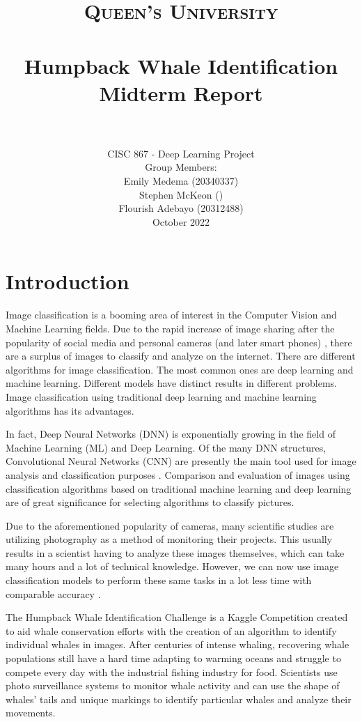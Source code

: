 \documentclass[paper=a4, fontsize=11pt]{scrartcl}
\title{
		\usefont{OT1}{bch}{b}{n}
		\normalfont \normalsize \textsc{Queen's University} \\ [25pt]
		\horrule{0.5pt} \\[0.4cm]
		\huge Humpback Whale Identification Midterm Report \\
		\horrule{2pt} \\[0.5cm]
}
\author{
    \normalfont 
      CISC 867 - Deep Learning Project \\
    \normalfont
    Group Members: \\ 
    \normalsize
    Emily Medema (20340337) \\ 
    \normalsize
    Stephen McKeon () \\ 
    \normalsize
    Flourish Adebayo (20312488) \\
    October 2022 \\ [3pt]}
\date{\vspace{-5ex}}
\numberwithin{equation}{section}		%
\numberwithin{table}{section}				%
\begin{document}
\maketitle



\newpage 

\section*{Introduction}\label{sec: intro}
Image classification is a booming area of interest in the Computer Vision and Machine Learning fields. Due to the rapid increase of image sharing after the popularity of social media and personal cameras (and later smart phones) \cite{}, there are a surplus of images to classify and analyze on the internet. There are different algorithms for image classification. The most common ones are deep learning and machine learning. Different models have distinct results in different problems. Image classification using traditional deep learning and machine learning algorithms has its advantages. 


In fact, Deep Neural Networks (DNN) is exponentially growing in the field of Machine Learning (ML) and Deep Learning. Of the many DNN structures, Convolutional Neural Networks (CNN) are presently the main tool used for image analysis and classification purposes \cite{}. Comparison and evaluation of images using classification algorithms based on traditional machine learning and deep learning are of great significance for selecting algorithms to classify pictures. 

Due to the aforementioned popularity of cameras, many scientific studies are utilizing photography as a method of monitoring their projects. This usually results in a scientist having to analyze these images themselves, which can take many hours and a lot of technical knowledge. However, we can now use image classification models to perform these same tasks in a lot less time with comparable accuracy \cite{}. 

The Humpback Whale Identification Challenge is a Kaggle Competition created to aid whale conservation efforts with the creation of an algorithm to identify individual whales in images. After centuries of intense whaling, recovering whale populations still have a hard time adapting to warming oceans and struggle to compete every day with the industrial fishing industry for food. Scientists use photo surveillance systems to monitor whale activity and can use the shape of whales’ tails and unique markings to identify particular whales and analyze their movements.
\end{document}
